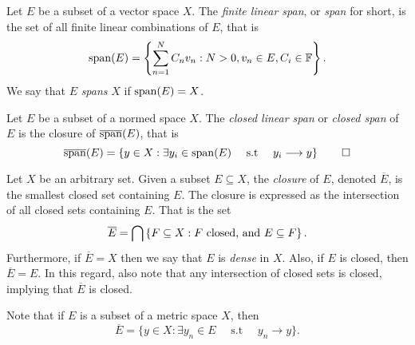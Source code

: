 \documentclass[../thesis.tex]{subfiles}
\begin{document}
\begin{definition}[Span]\label{def:span}
    Let $E$ be a subset of a vector space $X$. The \emph{finite linear span}, or \emph{span} for short, is the set of all finite linear combinations of $E$, that is
    \begin{equation*}
        \operatorname{span}(E)=\left\{\sum_{n=1}^N C_n v_n : N>0, v_n \in E, C_i \in \mathbb{F}\right\}.
    \end{equation*}
    We say that $E$ \emph{spans} $X$ if $\operatorname{span}(E) = X$.
\end{definition}


\begin{definition}\label{def:closed_span}
    Let $E$ be a subset of a normed space $X$. The \emph{closed linear span} or \emph{closed span} of $E$ is the closure of $\overline{\operatorname{span}}(E)$, that is
    \begin{equation*}
        \overline{\operatorname{span}}(E) = \left\{y\in X: \exists y_i\in \operatorname{span}(E) \quad \text{ s.t } \quad y_i \longrightarrow y\right\} \qedhere
    \end{equation*}
\end{definition}


\begin{definition}[Closure]\label{def:closure}
    Let $X$ be an arbitrary set. Given a subset $E \subseteq X$, the \emph{closure} of $E$, denoted $\overline{E}$, is the smallest closed set containing $E$. The closure is expressed as the intersection of all closed sets containing $E$. That is the set
    \begin{equation*}
        \overline{E} = \bigcap \left\{F \subseteq X : F \text{ closed, and } E \subseteq F\right\}.
    \end{equation*}
    Furthermore, if $\overline{E} = X$ then we say that $E$ is \emph{dense} in $X$. Also, if $E$ is closed, then $\overline{E}=E$. In this regard, also note that any intersection of closed sets is closed, implying that $\overline{E}$ is closed.
\end{definition}
\begin{remark}
    Note that if $E$ is a subset of a metric space $X$, then
    \begin{equation*}
        \overline{E} = \{ y \in X : \exists y_n\in E \quad \text{ s.t }\quad y_n \longrightarrow y\}.
    \end{equation*}
\end{remark}
\end{document}

